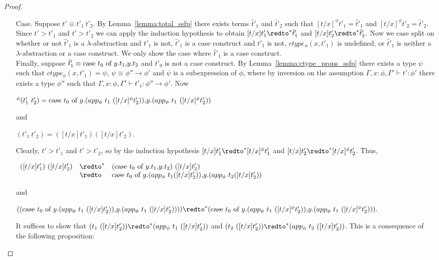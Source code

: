 \begin{proof}
\begin{itemize}
  \item[Case.] Suppose $t' \equiv t'_1\ t'_2$.  By Lemma~\ref{lemma:total_ssfp}
    there exists terms $\hat{t}'_1$ and $\hat{t}'_2$
    such that $[t/x]^\phi t'_1 = \hat{t}'_1$ and $[t/x]^\phi t'_2 = \hat{t}'_2$.  Since
    $t' > t'_1$ and $t' > t'_2$ we can apply the induction hypothesis to obtain
    $[t/x]t'_1 \redto^* \hat{t}'_1$ and $[t/x]t'_2 \redto^* \hat{t}'_2$.  Now we case
    split on whether or not $\hat{t}'_1$ is a $\lambda$-abstraction and $t'_1$ is not, $\hat{t}'_1$ is a case construct and
    $t'_1$ is not, $ctype_\phi(x,t'_1)$ is undefined, or $\hat{t}'_1$ is neither a $\lambda$-abstraction or a case construct.  
    We only show the case where $\hat{t}'_1$ is a case construct.
    \ \\
    Finally, suppose $\hat{t}'_1 \equiv \mbox{case}\ t_0\ \text{of}\ y\text{.}t_1\text{,}y\text{.}t_2$ and $t'_0$ is not a case construct.  By Lemma~\ref{lemma:ctype_props_ssfp}
    there exists a type $\psi$ such that $ctype_\phi(x,t'_1) = \psi$, $\psi \equiv \phi'' \to \phi'$ and $\psi$ is a subexpression
    of $\phi$, where by inversion on the assumption $\Gamma,x:\phi,\Gamma' \vdash t':\phi'$ there exists a type $\phi''$ such that
    $\Gamma,x:\phi,\Gamma' \vdash t'_1:\phi'' \to \phi'$.  Now 
    \begin{center}
      \begin{math}
        [t/x]^\phi (t'_1\ t'_2) = \ccon{t_0}{y}{(app_\phi\ t_1\ ([t/x]^\phi t'_2))}{(app_\phi\ t_1\ ([t/x]^\phi t'_2))}
      \end{math}
    \end{center}
    and
    \begin{center}
      \begin{math}
        [t/x](t'_1\ t'_2) = ([t/x]t'_1)([t/x]t'_2).
      \end{math}
    \end{center}
    Clearly, $t' > t'_1$ and $t' > t'_2$, so by the induction hypothesis $[t/x]t'_1 \redto^* [t/x]^\phi t'_1$ and $[t/x]t'_2 \redto^* [t/x]^\phi t'_2$.  Thus,
    \begin{center}
      \begin{math}
        \begin{array}{lll}
          ([t/x]t'_1)\ ([t/x]t'_2) & \redto^* & (\ccon{t_0}{y}{t_1}{t_2})\ ([t/x]t'_2)\\
          & \redto & \ccon{t_0}{y}{(app_\phi\ t_1 ([t/x]t'_2))}{(app_\phi\ t_2 ([t/x]t'_2))}
        \end{array}
      \end{math}
    \end{center}
    and
    \begin{center}
      \begin{math}
        ((\ccon{t_0}{y}{(app_\phi\ t_1\ ([t/x] t'_2))}{(app_\phi\ t_1\ ([t/x] t'_2))})) \redto^* (\ccon{t_0}{y}{(app_\phi\ t_1\ ([t/x]^\phi t'_2))}{(app_\phi\ t_1\ ([t/x]^\phi t'_2))}).
      \end{math}
    \end{center}
    It suffices to show that $(t_1\ ([t/x] t'_2)) \redto^* (app_\phi\ t_1\ ([t/x] t'_2))$ and 
    $(t_2\ ([t/x] t'_2)) \redto^* (app_\phi\ t_2\ ([t/x] t'_2))$.  This is a consequence of the following proposition:
    

\end{itemize}
\end{proof}
